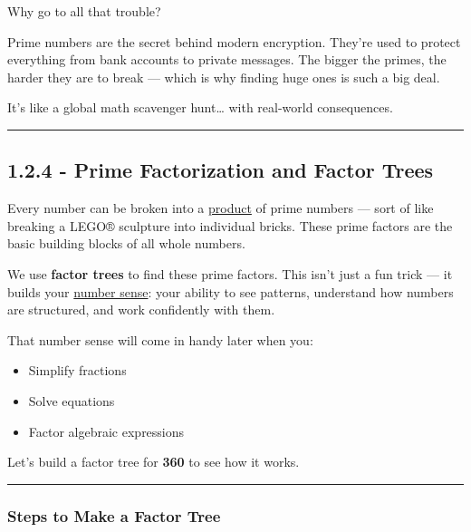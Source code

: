 \documentclass[
  letterpaper,
  DIV=11,
  numbers=noendperiod]{scrreprt}
\providecommand{\tightlist}{%
  \setlength{\itemsep}{0pt}\setlength{\parskip}{0pt}}
\begin{document}
Why go to all that trouble?

Prime numbers are the secret behind modern encryption. They're used to
protect everything from bank accounts to private messages. The bigger
the primes, the harder they are to break --- which is why finding huge
ones is such a big deal.

It's like a global math scavenger hunt\ldots{} with real-world
consequences.

\begin{center}\rule{0.5\linewidth}{0.5pt}\end{center}

\subsection*{1.2.4 - Prime Factorization and Factor
Trees}\label{prime-factorization-and-factor-trees}

Every number can be broken into a
\href{./glossary.html\#glossary-product}{product} of prime numbers ---
sort of like breaking a LEGO® sculpture into individual bricks. These
prime factors are the basic building blocks of all whole numbers.

We use \textbf{factor trees} to find these prime factors. This isn't
just a fun trick --- it builds your
\href{./glossary.html\#glossary-number-sense}{number sense}: your
ability to see patterns, understand how numbers are structured, and work
confidently with them.

That number sense will come in handy later when you:

\begin{itemize}
\tightlist
\item
  Simplify fractions
\item
  Solve equations
\item
  Factor algebraic expressions
\end{itemize}

Let's build a factor tree for \textbf{360} to see how it works.

\begin{center}\rule{0.5\linewidth}{0.5pt}\end{center}

\subsubsection*{Steps to Make a Factor
Tree}\label{steps-to-make-a-factor-tree}
\end{document}

